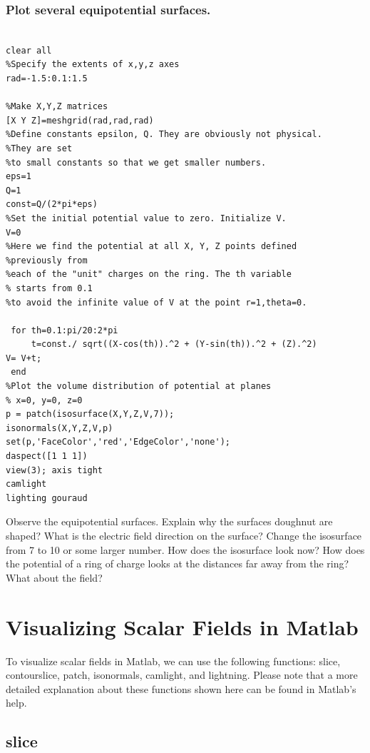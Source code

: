 \documentclass{ximera}
\begin{document}
\subsubsection{ Plot several equipotential surfaces. }




\begin{verbatim}

clear all
%Specify the extents of x,y,z axes
rad=-1.5:0.1:1.5
 
%Make X,Y,Z matrices 
[X Y Z]=meshgrid(rad,rad,rad)
%Define constants epsilon, Q. They are obviously not physical. 
%They are set 
%to small constants so that we get smaller numbers.
eps=1
Q=1
const=Q/(2*pi*eps)
%Set the initial potential value to zero. Initialize V.
V=0
%Here we find the potential at all X, Y, Z points defined 
%previously from
%each of the "unit" charges on the ring. The th variable
% starts from 0.1
%to avoid the infinite value of V at the point r=1,theta=0. 
 
 for th=0.1:pi/20:2*pi
     t=const./ sqrt((X-cos(th)).^2 + (Y-sin(th)).^2 + (Z).^2)
V= V+t;
 end
%Plot the volume distribution of potential at planes
% x=0, y=0, z=0
p = patch(isosurface(X,Y,Z,V,7));
isonormals(X,Y,Z,V,p)
set(p,'FaceColor','red','EdgeColor','none');
daspect([1 1 1])
view(3); axis tight
camlight 
lighting gouraud
\end{verbatim}



Observe the equipotential surfaces. Explain why the surfaces doughnut are shaped? What is the electric field direction on the surface? Change the isosurface from 7 to 10 or some larger number. How does the isosurface look now? How does the potential of a ring of charge looks at the distances far away from the ring? What about the field?







\section{Visualizing Scalar Fields in Matlab}

To visualize scalar fields in Matlab, we can use the following functions: slice, contourslice, patch, isonormals, camlight, and lightning. Please note that a more detailed explanation about these functions shown here can be found in Matlab's help.

\subsection{slice}
 
\end{document}
